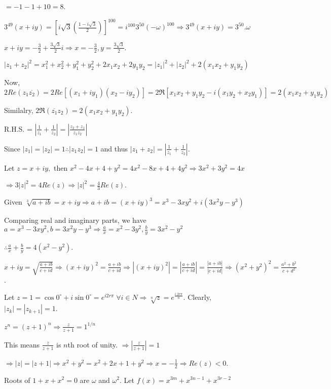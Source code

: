   $= -1 - 1 + 10 = 8$.
\item $3^{49}(x + iy) = \left[i\sqrt{3}\left(\frac{1 - i\sqrt{3}}{2}\right)\right]^{100} =
  i^{100}3^{50}(-\omega)^{100} \Rightarrow 3^{49}(x + iy) = 3^{50}.\omega$

  $x + iy = -\frac{3}{2} + \frac{3\sqrt{3}}{2}i\Rightarrow x = -\frac{3}{2}, y = \frac{3\sqrt{3}}{2}$.
\item $|z_1 + z_2|^2 = x_1^2 + x_2^2 + y_1^2 + y_2^2 + 2x_1x_2 + 2y_1y_2 = |z_1|^2 + |z_2|^2 + 2(x_1x_2 +
  y_1y_2)$

  Now, $2Re(z_1\overline{z_2}) = 2Re[(x_1 + iy_1)(x_2 - iy_2)] = 2\Re[x_1x_2 + y_1y_2 -i(x_1y_2 + x_2y_1)] =
  2(x_1x_2 + y_1y_2)$

  Similalry, $2\Re(\overline{z_1}z_2) = 2(x_1x_2 + y_1y_2)$.
\item R.H.S. = $\left|\frac{1}{z_1} + \frac{1}{z_2}\right| = \left|\frac{z_2 + z_1}{z_1z_2}\right|$

  Since $|z_1| = |z_2| = 1 \therefore |z_1z_2| = 1$ and thus $|z_1 + z_2| = \left|\frac{1}{z_1} +
  \frac{1}{z_2}\right|$.
\item Let $z = x + iy,$ then $x^2 - 4x + 4 + y^2 = 4x^2 - 8x + 4 + 4y^2 \Rightarrow 3x^2 + 3y^2 = 4x$

  $\Rightarrow 3|z|^2 = 4Re(z) \Rightarrow |z|^2 = \frac{4}{3}Re(z)$.
\item Given $\sqrt[3]{a + ib} = x + iy \Rightarrow a + ib = (x + iy)^3 = x^3 - 3xy^2 + i(3x^2y - y^3)$

  Comparing real and imaginary parts, we have $a = x^3 - 3xy^2, b = 3x^2y - y^3 \Rightarrow \frac{a}{x} =
  x^2 - 3y^2, \frac{b}{y} =3x^2- y^2$

  $\therefore \frac{a}{x} + \frac{b}{y} = 4(x^2 - y^2)$.
\item $x + iy = \sqrt{\frac{a + ib}{c + id}} \Rightarrow (x + iy)^2 = \frac{a + ib}{c + id} \Rightarrow |(x
  + iy)^2| = \left|\frac{a + ib}{c + id}\right| = \frac{|a + ib|}{|c + id|} \Rightarrow (x^2 + y^2)^2 =
  \frac{a^2 + b^2}{c + d^2}$.
\item Let $z = 1 = \cos0^\circ + i\sin0^\circ = e^{i2r\pi}\;\forall i \in N \Rightarrow \sqrt[n]{z} =
  e^{\frac{i.2r\pi}{n}}$. Clearly, $|z_k| = |z_{k + 1}| = 1$.
\item $z^n  = (z + 1)^n \Rightarrow \frac{z}{z + 1} = 1^{1/n}$

  This means $\frac{z}{z + 1}$ is $n$th root of unity. $\Rightarrow \left|\frac{z}{z + 1}\right| = 1$

  $\Rightarrow |z| = |z + 1| \Rightarrow x^2 + y^2 = x^2 + 2x + 1 + y^2 \Rightarrow x = -\frac{1}{2}
  \Rightarrow Re(z) < 0$.
\item Roots of $1 + x + x^2 = 0$ are $\omega$ and $\omega^2.$ Let $f(x) = x^{3m} + x^{3n - 1} + x^{3r - 2}$

